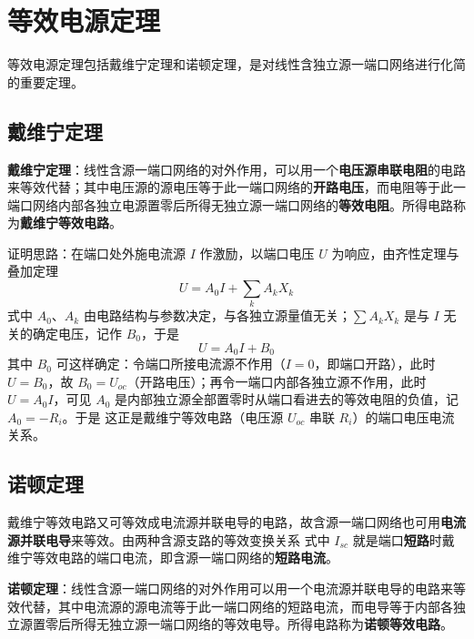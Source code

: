 
\section{等效电源定理}
等效电源定理包括戴维宁定理和诺顿定理，是对线性含独立源一端口网络进行化简的重要定理。

\subsection{戴维宁定理}
\textbf{戴维宁定理}：线性含源一端口网络的对外作用，可以用一个\textbf{电压源串联电阻}的电路来等效代替；其中电压源的源电压等于此一端口网络的\textbf{开路电压}，而电阻等于此一端口网络内部各独立电源置零后所得无独立源一端口网络的\textbf{等效电阻}。所得电路称为\textbf{戴维宁等效电路}。

证明思路：在端口处外施电流源 $I$ 作激励，以端口电压 $U$ 为响应，由齐性定理与叠加定理
\begin{equation}
U=A_0I+\sum_{k}A_kX_k
\end{equation}
式中 $A_0$、$A_k$ 由电路结构与参数决定，与各独立源量值无关；$\sum A_kX_k$ 是与 $I$ 无关的确定电压，记作 $B_0$，于是
\begin{equation}
U=A_0I+B_0
\end{equation}
其中 $B_0$ 可这样确定：令端口所接电流源不作用（$I=0$，即端口开路），此时 $U=B_0$，故 $B_0=U_{oc}$（开路电压）；再令一端口内部各独立源不作用，此时 $U=A_0I$，可见 $A_0$ 是内部独立源全部置零时从端口看进去的等效电阻的负值，记 $A_0=-R_i$。于是
这正是戴维宁等效电路（电压源 $U_{oc}$ 串联 $R_i$）的端口电压电流关系。

\subsection{诺顿定理}
戴维宁等效电路又可等效成电流源并联电导的电路，故含源一端口网络也可用\textbf{电流源并联电导}来等效。由两种含源支路的等效变换关系
式中 $I_{sc}$ 就是端口\textbf{短路}时戴维宁等效电路的端口电流，即含源一端口网络的\textbf{短路电流}。

\textbf{诺顿定理}：线性含源一端口网络的对外作用可以用一个电流源并联电导的电路来等效代替，其中电流源的源电流等于此一端口网络的短路电流，而电导等于内部各独立源置零后所得无独立源一端口网络的等效电导。所得电路称为\textbf{诺顿等效电路}。

